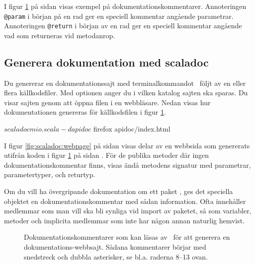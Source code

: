 I figur \ref{fig:scaladoc:mio} på sidan \pageref{fig:scaladoc:mio} visas exempel på dokumentationskommentarer. Annoteringen \verb|@param| i början på en rad ger en speciell kommentar angående parametrar. Annoteringen \verb|@return| i början av en rad ger en speciell kommentar angående vad som returneras vid metodanrop.


\subsection{Generera dokumentation med scaladoc}


Du genererar en dokumentationssajt med terminalkommandot \scaladoc\ följt av en eller flera källkodsfiler. Med optionen  anger du i vilken katalog sajten ska sparas. Du visar sajten genom att öppna filen  i en webbläsare. Nedan visas hur dokumentationen genereras för källkodsfilen i figur \ref{fig:scaladoc:mio}.
\begin{REPLnonum}
$ scaladoc mio.scala -d apidoc
$ firefox apidoc/index.html
\end{REPLnonum}

I figur \ref{fig:scaladoc:webpage} på sidan \pageref{fig:scaladoc:webpage} visas delar av en webbsida som genererats utifrån koden i figur \ref{fig:scaladoc:mio} på sidan \pageref{fig:scaladoc:mio}. För de publika metoder där ingen dokumentationskommentar finns, visas ändå metodens signatur med parametrar, parametertyper, och returtyp. %


Om du vill ha övergripande dokumentation om ett paket , ges det speciella objektet  en dokumentationskommentar med sådan information. Ofta innehåller  medlemmar som man vill ska bli synliga vid import av paketet, så som variabler, metoder och implicita medlemmar som inte har någon annan naturlig hemvist.

\begin{figure}[b]
    \caption{Dokumentationskommentarer som kan läsas av \scaladoc\ för att generera en dokumentations-webbsajt. Sådana kommentarer börjar  med snedstreck och dubbla asterisker, se bl.a. raderna 8--13 ovan.}
    \label{fig:scaladoc:mio}
\end{figure}

